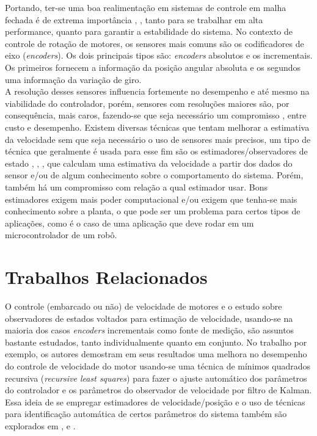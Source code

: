 Portando, ter-se uma boa realimentação em sistemas de controle em malha fechada é de extrema importância \cite{analise_incr_enc}, \cite{simple_speed_feedback}, tanto para se trabalhar em alta performance, quanto para garantir a estabilidade do sistema. No contexto de controle de rotação de motores, os sensores mais comuns são os codificadores de eixo (\emph{encoders}). Os dois principais tipos são: \emph{encoders} absolutos e os incrementais. Os primeiros fornecem a informação da posição angular absoluta e os segundos uma informação da variação de giro. \\

A resolução desses sensores influencia fortemente no desempenho e até mesmo na viabilidade do controlador, porém, sensores com resoluções maiores são, por consequência, mais caros, fazendo-se que seja necessário um compromisso \cite{analise_incr_enc}, \cite{low_precision_encoder01} entre custo e desempenho. Existem diversas técnicas que tentam melhorar a estimativa da velocidade sem que seja necessário o uso de sensores mais precisos, um tipo de técnica que geralmente é usada para esse fim são os estimadores/observadores de estado \cite{analise_incr_enc}, \cite{speed_observer_IA}, \cite{observer_speed}, que calculam uma estimativa da velocidade a partir dos dados do sensor e/ou de algum conhecimento sobre o comportamento do sistema. Porém, também há um compromisso com relação a qual estimador usar. Bons estimadores exigem mais poder computacional e/ou exigem que tenha-se mais conhecimento sobre a planta, o que pode ser um problema para certos tipos de aplicações, como é o caso de uma aplicação que deve rodar em um microcontrolador de um robô.\\

\section{Trabalhos Relacionados}
\label{sec:trabalhos_relacionados}

O controle (embarcado ou não) de velocidade de motores e o estudo sobre observadores de estados voltados para estimação de velocidade, usando-se na maioria dos casos \emph{encoders} incrementais como fonte de medição, são assuntos bastante estudados, tanto individualmente quanto em conjunto. No trabalho \cite{low_precision_encoder01} por exemplo, os autores demostram em seus resultados uma melhora no desempenho do controle de velocidade do motor usando-se uma técnica de mínimos quadrados recursiva (\emph{recursive least squares}) para fazer o ajuste automático dos parâmetros do controlador e os parâmetros do observador de velocidade por filtro de Kalman. Essa ideia de se empregar estimadores de velocidade/posição e o uso de técnicas para identificação automática de certos parâmetros do sistema também são explorados em \cite{LOW_SPEED_CONTROL}, \cite{Y_HORI_01} e \cite{Y_HORI_02}.\\

